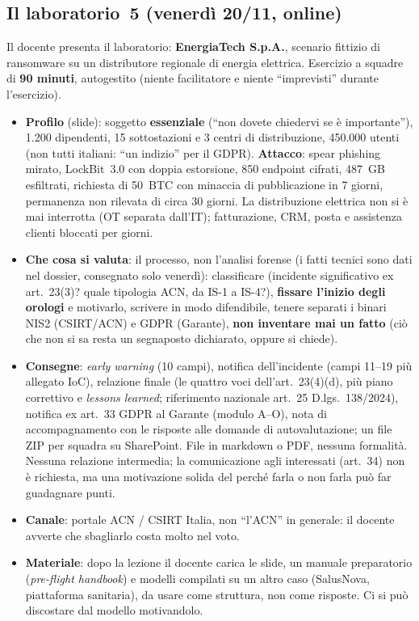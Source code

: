 \subsection{Il laboratorio~5 (venerdì 20/11, online)}
Il docente presenta il laboratorio: \textbf{EnergiaTech S.p.A.}, scenario fittizio di ransomware su
un distributore regionale di energia elettrica. Esercizio a squadre di \textbf{90 minuti}, autogestito
(niente facilitatore e niente ``imprevisti'' durante l'esercizio).
\begin{itemize}
  \item \textbf{Profilo} (slide): soggetto \textbf{essenziale} (``non dovete chiedervi se è
    importante''), 1.200 dipendenti, 15 sottostazioni e 3 centri di distribuzione, 450.000 utenti (non
    tutti italiani: ``un indizio'' per il GDPR). \textbf{Attacco}: spear phishing mirato, LockBit~3.0
    con doppia estorsione, 850 endpoint cifrati, 487~GB esfiltrati, richiesta di 50~BTC con minaccia di
    pubblicazione in 7 giorni, permanenza non rilevata di circa 30 giorni. La distribuzione elettrica
    non si è mai interrotta (OT separata dall'IT); fatturazione, CRM, posta e assistenza clienti
    bloccati per giorni.
  \item \textbf{Che cosa si valuta}: il processo, non l'analisi forense (i fatti tecnici sono dati
    nel dossier, consegnato solo venerdì): classificare (incidente significativo ex art.~23(3)?
    quale tipologia ACN, da IS-1 a IS-4?), \textbf{fissare l'inizio degli orologi} e motivarlo, scrivere
    in modo difendibile, tenere separati i binari NIS2 (CSIRT/ACN) e GDPR (Garante), \textbf{non
    inventare mai un fatto} (ciò che non si sa resta un segnaposto dichiarato, oppure si chiede).
  \item \textbf{Consegne}: \emph{early warning} (10 campi), notifica dell'incidente (campi 11--19 più
    allegato IoC), relazione finale (le quattro voci dell'art.~23(4)(d), più piano correttivo e
    \emph{lessons learned}; riferimento nazionale art.~25 D.lgs.~138/2024), notifica ex art.~33 GDPR al
    Garante (modulo A--O), nota di accompagnamento con le risposte alle domande di autovalutazione; un
    file ZIP per squadra su SharePoint. File in markdown o PDF, nessuna formalità. Nessuna relazione
    intermedia; la comunicazione agli interessati (art.~34) non è richiesta, ma una motivazione solida
    del perché farla o non farla può far guadagnare punti.
  \item \textbf{Canale}: portale ACN / CSIRT Italia, non ``l'ACN'' in generale: il docente avverte che
    sbagliarlo costa molto nel voto.
  \item \textbf{Materiale}: dopo la lezione il docente carica le slide, un manuale preparatorio
    (\emph{pre-flight handbook}) e modelli compilati su un altro caso (SalusNova, piattaforma
    sanitaria), da usare come struttura, non come risposte. Ci si può discostare dal modello
    motivandolo.
\end{itemize}
